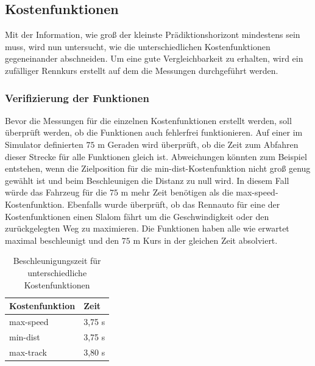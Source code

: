 \documentclass{like}
\begin{document}
\subsection{Kostenfunktionen}
Mit der Information, wie groß der kleinste Prädiktionshorizont mindestens sein muss, wird nun untersucht, wie die unterschiedlichen Kostenfunktionen gegeneinander abschneiden. Um eine gute Vergleichbarkeit zu erhalten, wird ein zufälliger Rennkurs erstellt auf dem die Messungen durchgeführt werden. 

\subsubsection{Verifizierung der Funktionen}
Bevor die Messungen für die einzelnen Kostenfunktionen erstellt werden, soll überprüft werden, ob die Funktionen auch fehlerfrei funktionieren. Auf einer im Simulator definierten $75$ m Geraden wird überprüft, ob die Zeit zum Abfahren dieser Strecke für alle Funktionen gleich ist. Abweichungen könnten zum Beispiel entstehen, wenn die Zielposition für die min-dist-Kostenfunktion nicht groß genug gewählt ist und beim Beschleunigen die Distanz zu null wird. In diesem Fall würde das Fahrzeug für die $75$ m mehr Zeit benötigen als die max-speed-Kostenfunktion. Ebenfalls wurde überprüft, ob das Rennauto für eine der Kostenfunktionen einen Slalom fährt um die Geschwindigkeit oder den zurückgelegten Weg zu maximieren.
Die Funktionen haben alle wie erwartet maximal beschleunigt und den $75$ m Kurs in der gleichen Zeit absolviert.

\begin{table}[]
	\centering
	\begin{tabular}{l|l}
		\hline
		Kostenfunktion	& Zeit  \\ \hline
		max-speed	&	3,75 s \\
		min-dist	&	3,75 s \\
		max-track	&	3,80 s \\

	\end{tabular}
	\caption{Beschleunigungszeit für unterschiedliche Kostenfunktionen}
	\label{accVerification}
\end{table}
\end{document}
